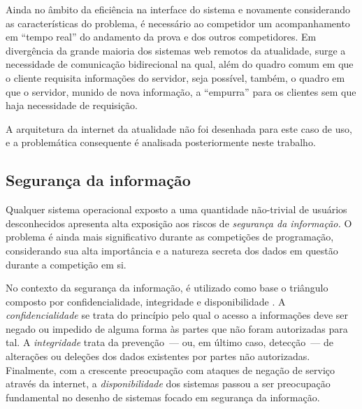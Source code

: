 \documentclass[ruledheader, 12pt]{abnt}
\begin{document}
Ainda no âmbito da eficiência na interface do sistema e novamente considerando as características do problema, é necessário ao competidor um acompanhamento em ``tempo real'' do andamento da prova e dos outros competidores. Em divergência da grande maioria dos sistemas web remotos da atualidade, surge a necessidade de comunicação bidirecional na qual, além do quadro comum em que o cliente requisita informações do servidor, seja possível, também, o quadro em que o servidor, munido de nova informação, a ``empurra'' para os clientes sem que haja necessidade de requisição.

A arquitetura da internet da atualidade não foi desenhada para este caso de uso, e a problemática consequente é analisada posteriormente neste trabalho.

\subsection{Segurança da informação}

Qualquer sistema operacional exposto a uma quantidade não-trivial de usuários desconhecidos apresenta alta exposição aos riscos de \emph{segurança da informação.} O problema é ainda mais significativo durante as competições de programação, considerando sua alta importância e a natureza secreta dos dados em questão durante a competição em si.

No contexto da segurança da informação, é utilizado como base o triângulo composto por confidencialidade, integridade e disponibilidade \cite{stamp2011}. A \emph{confidencialidade} se trata do princípio pelo qual o acesso a informações deve ser negado ou impedido de alguma forma às partes que não foram autorizadas para tal. A \emph{integridade} trata da prevenção~--- ou, em último caso, detecção~--- de alterações ou deleções dos dados existentes por partes não autorizadas. Finalmente, com a crescente preocupação com ataques de negação de serviço através da internet, a \emph{disponibilidade} dos sistemas passou a ser preocupação fundamental no desenho de sistemas focado em segurança da informação.
\end{document}
